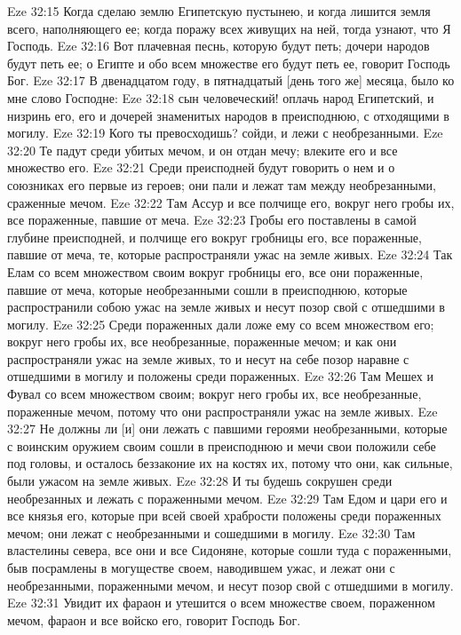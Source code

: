 Eze 32:15  Когда сделаю землю Египетскую пустынею, и когда лишится земля всего, наполняющего ее; когда поражу всех живущих на ней, тогда узнают, что Я Господь.
Eze 32:16  Вот плачевная песнь, которую будут петь; дочери народов будут петь ее; о Египте и обо всем множестве его будут петь ее, говорит Господь Бог.
Eze 32:17  В двенадцатом году, в пятнадцатый [день того же] месяца, было ко мне слово Господне:
Eze 32:18  сын человеческий! оплачь народ Египетский, и низринь его, его и дочерей знаменитых народов в преисподнюю, с отходящими в могилу.
Eze 32:19  Кого ты превосходишь? сойди, и лежи с необрезанными.
Eze 32:20  Те падут среди убитых мечом, и он отдан мечу; влеките его и все множество его.
Eze 32:21  Среди преисподней будут говорить о нем и о союзниках его первые из героев; они пали и лежат там между необрезанными, сраженные мечом.
Eze 32:22  Там Ассур и все полчище его, вокруг него гробы их, все пораженные, павшие от меча.
Eze 32:23  Гробы его поставлены в самой глубине преисподней, и полчище его вокруг гробницы его, все пораженные, павшие от меча, те, которые распространяли ужас на земле живых.
Eze 32:24  Так Елам со всем множеством своим вокруг гробницы его, все они пораженные, павшие от меча, которые необрезанными сошли в преисподнюю, которые распространили собою ужас на земле живых и несут позор свой с отшедшими в могилу.
Eze 32:25  Среди пораженных дали ложе ему со всем множеством его; вокруг него гробы их, все необрезанные, пораженные мечом; и как они распространяли ужас на земле живых, то и несут на себе позор наравне с отшедшими в могилу и положены среди пораженных.
Eze 32:26  Там Мешех и Фувал со всем множеством своим; вокруг него гробы их, все необрезанные, пораженные мечом, потому что они распространяли ужас на земле живых.
Eze 32:27  Не должны ли [и] они лежать с павшими героями необрезанными, которые с воинским оружием своим сошли в преисподнюю и мечи свои положили себе под головы, и осталось беззаконие их на костях их, потому что они, как сильные, были ужасом на земле живых.
Eze 32:28  И ты будешь сокрушен среди необрезанных и лежать с пораженными мечом.
Eze 32:29  Там Едом и цари его и все князья его, которые при всей своей храбрости положены среди пораженных мечом; они лежат с необрезанными и сошедшими в могилу.
Eze 32:30  Там властелины севера, все они и все Сидоняне, которые сошли туда с пораженными, быв посрамлены в могуществе своем, наводившем ужас, и лежат они с необрезанными, пораженными мечом, и несут позор свой с отшедшими в могилу.
Eze 32:31  Увидит их фараон и утешится о всем множестве своем, пораженном мечом, фараон и все войско его, говорит Господь Бог.
